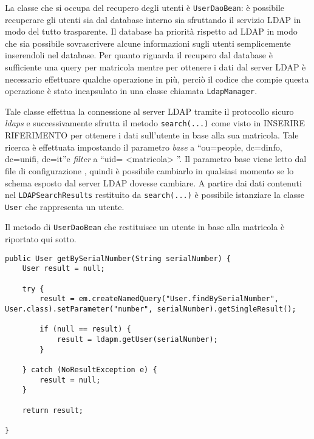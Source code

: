 La classe che si occupa del recupero degli utenti è \texttt{UserDaoBean}: è possibile recuperare gli utenti sia dal database interno sia sfruttando il servizio LDAP in modo del tutto trasparente.
Il database ha priorità rispetto ad LDAP in modo che sia possibile sovrascrivere alcune informazioni sugli utenti semplicemente inserendoli nel database. Per quanto riguarda il recupero dal database è sufficiente una query per matricola 
mentre per ottenere i dati dal server LDAP è necessario effettuare qualche operazione in più, perciò il codice che compie questa operazione è stato incapsulato in una classe chiamata \texttt{LdapManager}.

Tale classe effettua la connessione al server LDAP tramite il protocollo sicuro \textsl{ldaps} e successivamente sfrutta il metodo \texttt{search(...)} come visto in INSERIRE RIFERIMENTO per ottenere i dati sull'utente in base alla sua matricola.
Tale ricerca è effettuata impostando il parametro \textsl{base} a ``ou=people, dc=dinfo, dc=unifi, dc=it''e \textsl{filter} a ``uid= <matricola> ''. Il parametro base viene letto dal file di configurazione 
, quindi è possibile cambiarlo in qualsiasi momento se lo schema esposto dal server LDAP dovesse cambiare.
A partire dai dati contenuti nel \texttt{LDAPSearchResults} restituito da \texttt{search(...)} è possibile istanziare la classe \texttt{User} che rappresenta un utente.

Il metodo di \texttt{UserDaoBean} che restituisce un utente in base alla matricola è riportato qui sotto.

\begin{lstlisting}
public User getBySerialNumber(String serialNumber) {
	User result = null;
	
	try {
		result = em.createNamedQuery("User.findBySerialNumber", User.class).setParameter("number", serialNumber).getSingleResult();
		
		if (null == result) {
			result = ldapm.getUser(serialNumber);
		}
		
	} catch (NoResultException e) {
		result = null;
	}

	return result;

}
\end{lstlisting}




